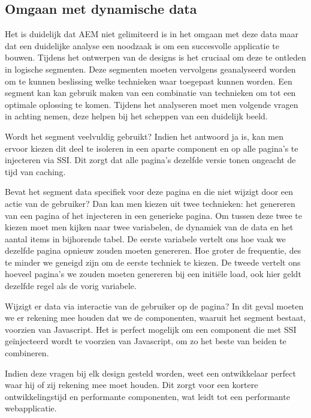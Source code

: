 \documentclass{article}
\begin{document}
    \subsection{Omgaan met dynamische data}
    Het is duidelijk dat AEM niet gelimiteerd is in het omgaan met deze data maar dat een duidelijke analyse een noodzaak is om een succesvolle applicatie te bouwen. Tijdens het ontwerpen van de designs is het cruciaal om deze te ontleden in logische segmenten. Deze segmenten moeten vervolgens geanalyseerd worden om te kunnen beslissing welke technieken waar toegepast kunnen worden. Een segment kan kan gebruik maken van een combinatie van technieken om tot een optimale oplossing te komen. Tijdens het analyseren moet men volgende vragen in achting nemen, deze helpen bij het scheppen van een duidelijk beeld.
    \par
    Wordt het segment veelvuldig gebruikt? Indien het antwoord ja is, kan men ervoor kiezen dit deel te isoleren in een aparte component en op alle pagina's te injecteren via SSI. Dit zorgt dat alle pagina's dezelfde versie tonen ongeacht de tijd van caching.
    \par
    Bevat het segment data specifiek voor deze pagina en die niet wijzigt door een actie van de gebruiker? Dan kan men kiezen uit twee technieken: het genereren van een pagina of het injecteren in een generieke pagina. Om tussen deze twee te kiezen moet men kijken naar twee variabelen, de dynamiek van de data en het aantal items in bijhorende tabel. De eerste variabele vertelt ons hoe vaak we dezelfde pagina opnieuw zouden moeten genereren. Hoe groter de frequentie, des te minder we geneigd zijn om de eerste techniek te kiezen. De tweede vertelt ons hoeveel pagina's we zouden moeten genereren bij een initi\"ele load, ook hier geldt dezelfde regel als de vorig variabele.
    \par
	Wijzigt er data via interactie van de gebruiker op de pagina? In dit geval moeten we er rekening mee houden dat we de componenten, waaruit het segment bestaat, voorzien van Javascript. Het is perfect mogelijk om een component die met SSI ge\"injecteerd wordt te voorzien van Javascript, om zo het beste van beiden te combineren.
	\par
	Indien deze vragen bij elk design gesteld worden, weet een ontwikkelaar perfect waar hij of zij rekening mee moet houden. Dit zorgt voor een kortere ontwikkelingstijd en performante componenten, wat leidt tot een performante webapplicatie.      
\end{document}

